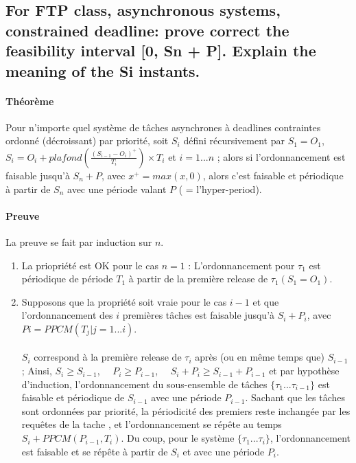 \subsection{For FTP class, asynchronous systems, constrained deadline: prove correct the feasibility interval [0, Sn + P]. Explain the meaning of the Si instants.}
\paragraph{Théorème} Pour n'importe quel système de tâches asynchrones à deadlines contraintes ordonné (décroissant) par priorité, soit $S_{i}$ défini récursivement par $S_{1} = O_{1}$, $S_{i} = O_{i} + plafond \left( \frac{(S_{i-1} - O_{i})^{+}}{T_{i}}  \right) \times T_{i}$ et $i=1...n$ ; alors si l'ordonnancement est faisable jusqu'à $S_{n} + P$, avec $x^{+} = max(x, 0)$, alors c'est faisable et périodique à partir de $S_{n}$ avec une période valant $P$ ( = l'hyper-period). 

\paragraph{Preuve} La preuve se fait par induction sur $n$.
\begin{enumerate}
\item La priopriété est OK pour le cas $n=1$ : L'ordonnancement pour $\tau_{1}$ est périodique de période $T_{1}$ à partir de la première release de $\tau_{1} (S_{1} = O_{1})$.
\item Supposons que la propriété soit vraie pour le cas $i-1$ et que l'ordonnancement des $i$ premières tâches est faisable jusqu'à $S_{i} + P_{i}$, avec $Pi = PPCM(T_{j} | j = 1...i)$.
\paragraph{}
$S_{i}$ correspond à la première release de $\tau_{i}$ après (ou en même temps que) $S_{i-1}$ ; Ainsi, $S_{i} \geq S_{i-1}$, $\quad P_{i} \geq P_{i-1}$, $\quad S_{i} + P_{i} \geq S_{i-1} + P_{i-1}$ et par hypothèse d'induction, l'ordonnancement du sous-ensemble de tâches $\{\tau_{1}...\tau_{i-1}\}$ est faisable et périodique de $S_{i-1}$ avec une période $P_{i-1}$. Sachant que les tâches sont ordonnées par priorité, la périodicité des premiers reste inchangée par les requêtes de la tache \ti, et l'ordonnancement se répête au temps $S_{i} + PPCM(P_{i-1}, T_{i})$. Du coup, pour le système $\{\tau_{1}...\tau_{i}\}$, l'ordonnancement est faisable et se répête à partir de $S_{i}$ et avec une période $P_{i}$.
\end{enumerate}
